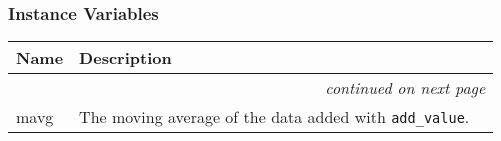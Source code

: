 
  \subsubsection{Instance Variables}

    \vspace{-1cm}
\hspace{\varindent}\begin{longtable}{|p{\varnamewidth}|p{\vardescrwidth}|l}
\cline{1-2}
\cline{1-2} \centering \textbf{Name} & \centering \textbf{Description}& \\
\cline{1-2}
\endhead\cline{1-2}\multicolumn{3}{r}{\small\textit{continued on next page}}\\\endfoot\cline{1-2}
\endlastfoot\raggedright m\-a\-v\-g\- & The moving average of the data added with \texttt{add\_value}.&\\
\cline{1-2}
\end{longtable}

